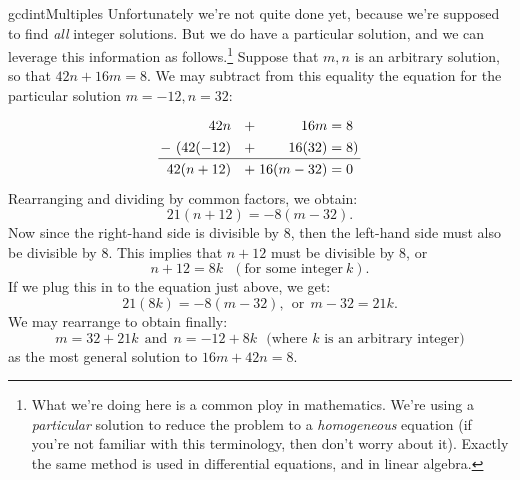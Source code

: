 \begin{example}{gcdintMultiples}
Unfortunately we're not quite done yet, because we're supposed to find \emph{all} integer solutions. But we do have a particular solution, and we can leverage this information as follows.\footnote{What we're doing here  is a common ploy in mathematics.  We're using a \emph{particular} solution to reduce the problem to a \emph{homogeneous} equation (if you're not familiar with this terminology, then don't worry about it).  Exactly the same method is used in differential equations, and in linear algebra.}
   Suppose that $m,n$ is an arbitrary solution, so that  $42n + 16m = 8$.  We may subtract from this  equality the equation for the particular solution $m=-12, n=32$: 
\[\arraycolsep=1.4pt\def\arraystretch{1.3}
\begin{array}{rcrcl } 
    42n &~~+& 16m  &=& 8  \\
 -~ (42(-12) &~~+& 16(32)  &=&  8)   \\
    \cline{1-5} 
    42(n+12) &~~+& 16(m-32) &=& 0   
\end{array}
\]
Rearranging and dividing by common factors, we obtain:
\[ 21(n+12) = -8(m-32).\]
Now since the right-hand side is divisible by 8, then the left-hand side must also be divisible by 8.  This implies that $n+12$ must be divisible by 8, or 
\[ n+12 = 8k~~~(\text{for some integer}~k). \]
If we plug this in to the equation just above, we get:
\[ 21(8k) = -8(m-32),~~\text{or}~~m-32 = 21k .\]
We may rearrange to obtain finally:
\[ m = 32 + 21k ~~\text{and}~~ n = -12 + 8k~~~(\text{where }k \text{  is an arbitrary integer)} \]
as the most general solution to  $16m + 42n = 8$.
\end {example}

